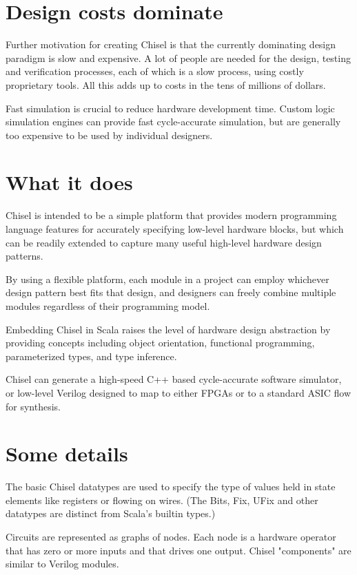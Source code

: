 \documentclass[a4paper,11pt]{article}
\begin{document}
\section{Design costs dominate}

Further motivation for creating Chisel is that the currently dominating design paradigm is slow and expensive. A lot of people are needed for the design, testing and verification processes, each of which is a slow process, using costly proprietary tools. All this adds up to costs in the tens of millions of dollars.

Fast simulation is crucial to reduce hardware development time. Custom logic simulation engines can provide fast cycle-accurate simulation, but are generally too expensive to be used by individual designers.

\section{What it does}

Chisel is intended to be a simple platform that provides modern programming language features for accurately specifying low-level hardware blocks, but which can be readily extended to capture many useful high-level hardware design patterns.

By using a flexible platform, each module in a project can employ whichever design pattern best fits that design, and designers can freely combine multiple modules regardless of their programming model.

Embedding Chisel in Scala raises the level of hardware design abstraction by providing concepts including object orientation, functional programming, parameterized types, and type inference.

Chisel can generate a high-speed C++ based cycle-accurate software simulator, or low-level Verilog designed to map to either FPGAs or to a standard ASIC flow for synthesis.

\section{Some details}

The basic Chisel datatypes are used to specify the type of values held in state elements like registers or flowing on wires. (The Bits, Fix, UFix and other datatypes are distinct from Scala's builtin types.)

Circuits are represented as graphs of nodes. Each node is a hardware operator that has zero or more inputs and that drives one output. Chisel "components" are similar to Verilog modules.
\end{document}

